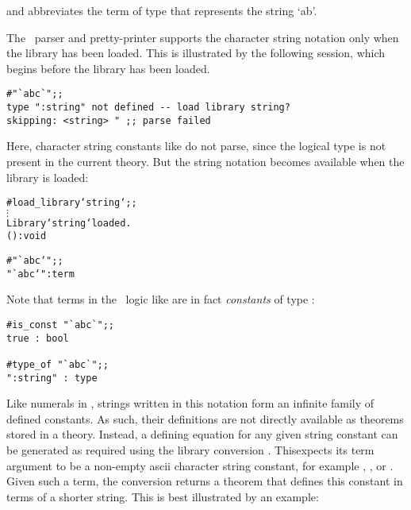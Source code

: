 \noindent and abbreviates the term of type  that represents the
string `ab'.

The \HOL\ parser and pretty-printer supports the character string notation only
when the  library has been loaded. This is illustrated by the
following session, which begins before the library has been loaded.

\setcounter{sessioncount}{1}
\begin{session}\begin{verbatim}
#"`abc`";;
type ":string" not defined -- load library string?
skipping: <string> " ;; parse failed
\end{verbatim}\end{session}

\noindent Here, character string constants like  do not parse,
since the logical type  is not present in the current theory. But
the string notation becomes available when the library is loaded:

\begin{session}\begin{alltt}
#load_library `string`;;
  \(\vdots\)
Library `string` loaded.
() : void

#"`abc`";;
"`abc`" : term
\end{alltt}\end{session}

\noindent Note that terms in the \HOL\ logic like  are in fact {\it
constants\/} of type :

\begin{session}\begin{verbatim}
#is_const "`abc`";;
true : bool

#type_of "`abc`";;
":string" : type
\end{verbatim}\end{session}

Like numerals in \HOL, strings
written in this notation form an infinite family of defined constants.  As
such, their definitions are not directly available as theorems stored in a
theory.  Instead, a defining equation for any given string constant can be
generated as required using the  library conversion
. This\pagebreak[3] expects its term argument to be a
non-empty ascii character string constant, for example , ,
or .  Given such a term, the conversion returns a theorem that
defines this constant in terms of a shorter string.  This is best illustrated
by an example:

